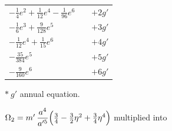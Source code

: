 \documentclass[11pt]{article}
\begin{document}
\begin{center}
\begin{tabular}{|l|l|l|}
$-\tfrac{1}{4}e^{2}+\tfrac{1}{12}e^{4}-\tfrac{1}{96}e^{6}$ &                           & $+2g'$ \\
$-\tfrac{1}{6}e^{3}+\tfrac{9}{128}e^{5}$               &                               & $+3g'$ \\
$-\tfrac{1}{12}e^{4}+\tfrac{1}{15}e^{6}$               &                               & $+4g'$ \\
$-\tfrac{35}{384}e^{5}$                                &                               & $+5g'$ \\
$-\tfrac{9}{160}e^{6}$                                 &                               & $+6g'$ \\
\hline
\end{tabular}
\end{center}

\noindent\hfill $*\ g'$ annual equation.

\bigskip
{} $\Omega_{2} = m'\,\dfrac{a^{4}}{a'^{5}}\Bigl(\tfrac{3}{4}-\tfrac{3}{2}\eta^{2}+\tfrac{3}{4}\eta^{4}\Bigr)$ multiplied into
\end{document}
